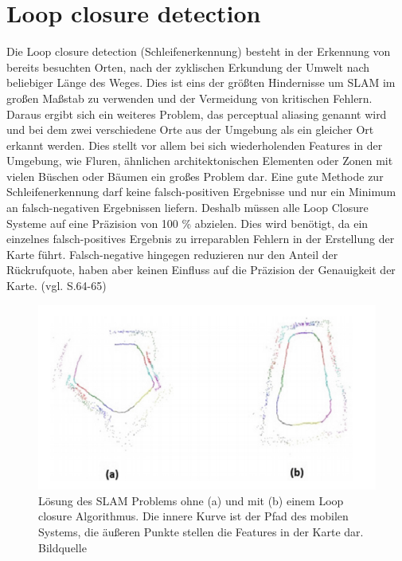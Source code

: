 \section{Loop closure detection}

Die \glqq Loop closure detection\grqq{} (Schleifenerkennung) besteht in der Erkennung von bereits besuchten Orten, nach der zyklischen Erkundung der Umwelt nach beliebiger Länge des Weges. Dies ist eins der größten Hindernisse um SLAM im großen Maßstab zu verwenden und der Vermeidung von kritischen Fehlern. Daraus ergibt sich ein weiteres Problem, das \glqq perceptual aliasing\grqq{} genannt wird und bei dem zwei verschiedene Orte aus der Umgebung als ein gleicher Ort erkannt werden. Dies stellt vor allem bei sich wiederholenden Features in der Umgebung, wie Fluren, ähnlichen architektonischen Elementen oder Zonen mit vielen Büschen oder Bäumen ein großes Problem dar. Eine gute Methode zur Schleifenerkennung darf keine falsch-positiven Ergebnisse und nur ein Minimum an falsch-negativen Ergebnissen liefern. Deshalb müssen alle Loop Closure Systeme auf eine Präzision von 100 \% abzielen. Dies wird benötigt, da ein einzelnes falsch-positives Ergebnis zu irreparablen Fehlern in der Erstellung der Karte führt. Falsch-negative hingegen reduzieren nur den Anteil der Rückrufquote, haben aber keinen Einfluss auf die Präzision der Genauigkeit der Karte. (vgl. \cite{survey} S.64-65)

\begin{figure}[H]
	\centering
	\includegraphics[scale=0.5]{loop.png}
	\caption{ Lösung des SLAM Problems ohne (a) und mit (b) einem Loop closure Algorithmus. Die innere Kurve ist der Pfad des mobilen Systems, die äußeren Punkte stellen die Features in der Karte dar. Bildquelle \cite{loop_closure}}
\end{figure}  

